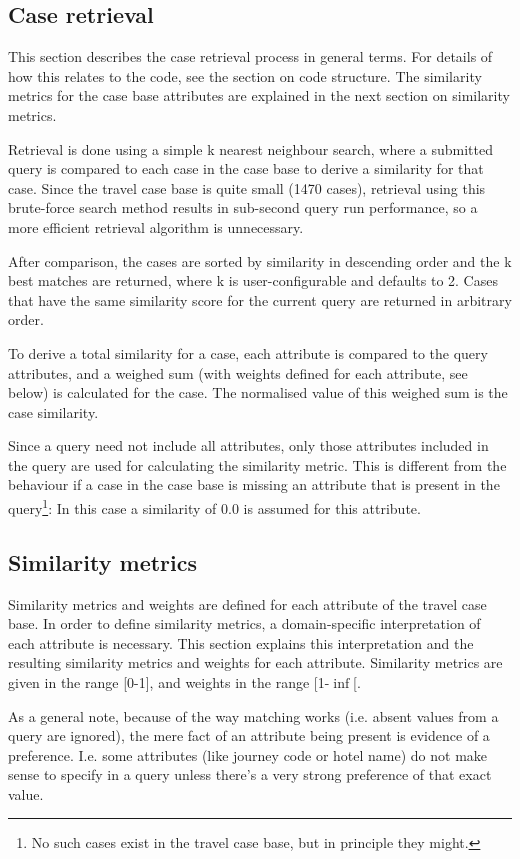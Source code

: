\documentclass[11pt]{article}
\begin{document}
\subsection{Case retrieval}
This section describes the case retrieval process in general terms.
For details of how this relates to the code, see the section on code
structure. The similarity metrics for the case base attributes are
explained in the next section on similarity metrics.

Retrieval is done using a simple k nearest neighbour search, where a
submitted query is compared to each case in the case base to derive a
similarity for that case. Since the travel case base is quite small
(1470 cases), retrieval using this brute-force search method results
in sub-second query run performance, so a more efficient retrieval
algorithm is unnecessary.

After comparison, the cases are sorted by similarity in descending
order and the k best matches are returned, where k is
user-configurable and defaults to 2. Cases that have the same
similarity score for the current query are returned in arbitrary
order.

To derive a total similarity for a case, each attribute is compared to
the query attributes, and a weighed sum (with weights defined for each
attribute, see below) is calculated for the case. The normalised value
of this weighed sum is the case similarity.

Since a query need not include all attributes, only those attributes
included in the query are used for calculating the similarity metric.
This is different from the behaviour if a case in the case base is
missing an attribute that is present in the query\protect\footnote{No such cases exist in the travel case base, but in principle
they might. }: In this case
a similarity of 0.0 is assumed for this attribute.

\subsection{Similarity metrics}
Similarity metrics and weights are defined for each attribute of the
travel case base. In order to define similarity metrics, a
domain-specific interpretation of each attribute is necessary. This
section explains this interpretation and the resulting similarity
metrics and weights for each attribute. Similarity metrics are given
in the range [0-1], and weights in the range [1-$\inf$[.

As a general note, because of the way matching works (i.e. absent
values from a query are ignored), the mere fact of an attribute being
present is evidence of a preference. I.e. some attributes (like
journey code or hotel name) do not make sense to specify in a query
unless there's a very strong preference of that exact value.
\end{document}
